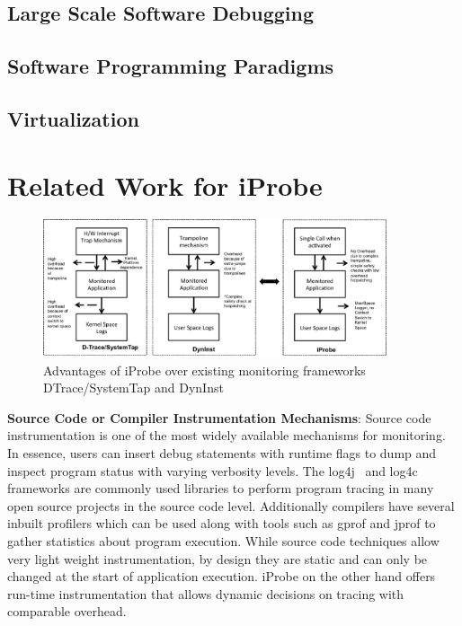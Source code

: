 \subsection{Large Scale Software Debugging}


\subsection{Software Programming Paradigms}


\subsection{Virtualization}

\section{Related Work for iProbe}



\begin{figure}[ht]
	\begin{center}
		\includegraphics[width=0.9\textwidth]{iprobe/Images/related.eps}
		\caption{Advantages of iProbe over existing monitoring frameworks DTrace/SystemTap and DynInst}
		\label{fig:related}
	\end{center}
\end{figure}

\noindent \textbf{Source Code or Compiler Instrumentation Mechanisms}: \quad
Source code instrumentation is one of the most widely available mechanisms for monitoring. 
In essence, users can insert debug statements with runtime flags to dump and inspect program status with varying verbosity levels. 
The log4j~\cite{log4j} and log4c~\cite{log4c} frameworks are commonly used libraries to perform program tracing in many open source projects in the source code level. 
Additionally compilers have several inbuilt profilers which can be used along with tools such as gprof and jprof to gather statistics about program execution.
While source code techniques allow very light weight instrumentation, by design they are static and can only be changed at the start of application execution. 
iProbe on the other hand offers run-time instrumentation that allows dynamic decisions on tracing with comparable overhead.


